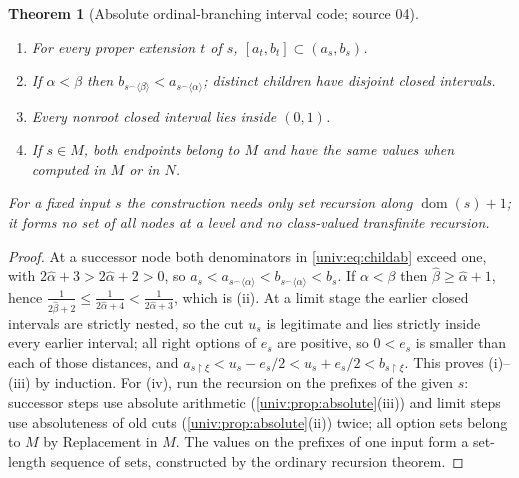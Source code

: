 \documentclass[11pt,letterpaper]{article}
\numberwithin{equation}{section}
\newtheorem{theorem}{Theorem}[section]
\theoremstyle{definition}
\theoremstyle{remark}
\newcommand{\dom}{\operatorname{dom}}
\newcommand{\res}{\mathbin{\upharpoonright}}
\newcommand{\cat}{\mathbin{{}^{\frown}}}
\newcommand{\seq}[1]{\langle#1\rangle}
\newcommand{\hatord}[1]{\widehat{#1}}
\begin{document}
\begin{theorem}[Absolute ordinal-branching interval code; source 04]\label{univ:thm:intervalcode}
\begin{enumerate}[label=\textnormal{(\roman*)}]
\item For every proper extension $t$ of $s$, $[a_t,b_t]\subset(a_s,b_s)$.
\item If $\alpha<\beta$ then $b_{s\cat\seq\beta}<a_{s\cat\seq\alpha}$; distinct
children have disjoint closed intervals.
\item Every nonroot closed interval lies inside $(0,1)$.
\item If $s\in M$, both endpoints belong to $M$ and have the same values when
computed in $M$ or in $N$.
\end{enumerate}
For a fixed input $s$ the construction needs only set recursion along
$\dom(s)+1$; it forms no set of all nodes at a level and no class-valued
transfinite recursion.
\end{theorem}
\begin{proof}
At a successor node both denominators in \eqref{univ:eq:childab} exceed one,
with $2\hatord\alpha+3>2\hatord\alpha+2>0$, so
$a_s<a_{s\cat\seq\alpha}<b_{s\cat\seq\alpha}<b_s$. If $\alpha<\beta$ then
$\hatord\beta\ge\hatord\alpha+1$, hence
$\frac1{2\hatord\beta+2}\le\frac1{2\hatord\alpha+4}<\frac1{2\hatord\alpha+3}$,
which is (ii). At a limit stage the earlier closed intervals are strictly
nested, so the cut $u_s$ is legitimate and lies strictly inside every earlier
interval; all right options of $e_s$ are positive, so $0<e_s$ is smaller than
each of those distances, and $a_{s\res\xi}<u_s-e_s/2<u_s+e_s/2<b_{s\res\xi}$.
This proves (i)--(iii) by induction. For (iv), run the recursion on the
prefixes of the given $s$: successor steps use absolute arithmetic
(\cref{univ:prop:absolute}(iii)) and limit steps use absoluteness of old cuts
(\cref{univ:prop:absolute}(ii)) twice; all option sets belong to $M$ by
Replacement in $M$. The values on the prefixes of one input form a set-length
sequence of sets, constructed by the ordinary recursion theorem.
\end{proof}
\end{document}
